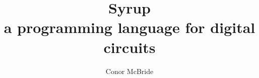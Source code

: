 \documentclass{article}
\begin{document}
\title{Syrup\\ {\large a programming language for digital circuits}}
\author{Conor McBride}
\maketitle
\end{document}
